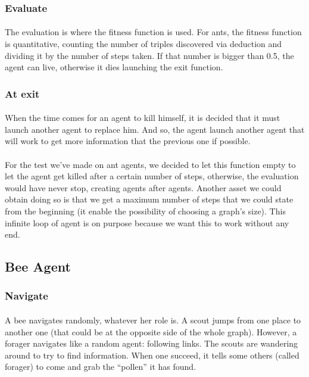 \documentclass{article}
\begin{document}
		\subsubsection{Evaluate}
			\paragraph{}
				The evaluation is where the fitness function is used.
				For ants, the fitness function is quantitative,
				counting the number of triples discovered via deduction and dividing it by the number of steps taken.
				If that number is bigger than 0.5, the agent can live, otherwise it dies launching the exit function.
		\subsubsection{At exit}
			\paragraph{}
				When the time comes for an agent to kill himself, it is decided that it must launch another agent to replace him.
				And so, the agent launch another agent that will work to get more information that the previous one if possible.
			\paragraph{}
				For the test we've made on ant agents,
				we decided to let this function empty to let the agent get killed after a certain number of steps,
				otherwise, the evaluation would have never stop, creating agents after agents.
				Another asset we could obtain doing so is that we get a maximum number of steps that we could state from the beginning
				(it enable the possibility of choosing a graph's size).
				This infinite loop of agent is on purpose because we want this to work without any end.
	\subsection{Bee Agent}
		\subsubsection{Navigate}
			\paragraph{}
				A bee navigates randomly, whatever her role is.
				A scout jumps from one place to another one (that could be at the opposite side of the whole graph).
				However, a forager navigates like a random agent: following links.
				The scouts are wandering around to try to find information.
				When one succeed, it tells some others (called forager) to come and grab the ``pollen'' it has found.
\end{document}
